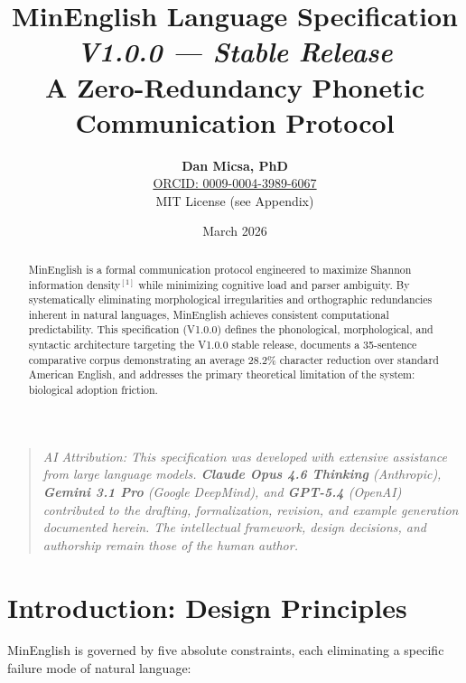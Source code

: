 \documentclass[12pt,onecolumn,letterpaper]{article}
\title{\Huge\textbf{MinEnglish Language Specification}\\[0.2em]
\LARGE\textit{V1.0.0 --- Stable Release}\\[0.3em]
\large A Zero-Redundancy Phonetic Communication Protocol}
\author{\textbf{Dan Micsa, PhD}\\
\small \href{https://orcid.org/0009-0004-3989-6067}{ORCID: 0009-0004-3989-6067}\\
\small MIT License (see Appendix)}
\date{March 2026}
\begin{document}
\maketitle
\thispagestyle{empty}

\begin{quote}
\small\textit{AI Attribution: This specification was developed with extensive
assistance from large language models. \textbf{Claude Opus 4.6 Thinking}
(Anthropic), \textbf{Gemini 3.1 Pro} (Google DeepMind), and \textbf{GPT-5.4}
(OpenAI) contributed to the drafting, formalization, revision, and example
generation documented herein. The intellectual framework, design decisions,
and authorship remain those of the human author.}
\end{quote}

\begin{abstract}
MinEnglish is a formal communication protocol engineered to maximize Shannon
information density$^{[1]}$ while minimizing cognitive load and parser
ambiguity. By systematically eliminating morphological irregularities and
orthographic redundancies inherent in natural languages, MinEnglish achieves
consistent computational predictability. This specification (V1.0.0) defines
the phonological, morphological, and syntactic architecture targeting the
V1.0.0 stable release, documents a 35-sentence comparative corpus
demonstrating an average 28.2\% character reduction over standard American
English, and addresses the primary theoretical limitation of the system:
biological adoption friction.
\end{abstract}

\tableofcontents
\vspace{1em}

\section{Introduction: Design Principles}

MinEnglish is governed by five absolute constraints, each eliminating a
specific failure mode of natural language:
\end{document}
